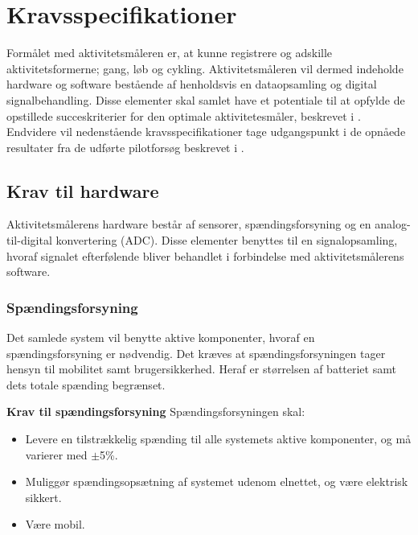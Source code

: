\section{Kravsspecifikationer}
Formålet med aktivitetsmåleren er, at kunne registrere og adskille aktivitetsformerne; gang, løb og cykling. Aktivitetsmåleren vil dermed indeholde hardware og software bestående af henholdsvis en dataopsamling og digital signalbehandling. Disse elementer skal samlet have et potentiale til at opfylde de opstillede succeskriterier for den optimale aktivitetesmåler, beskrevet i . \newline
Endvidere vil nedenstående kravsspecifikationer tage udgangspunkt i de opnåede resultater fra de udførte pilotforsøg beskrevet i  .

\subsection{Krav til hardware}
Aktivitetsmålerens hardware består af sensorer, spændingsforsyning og en analog-til-digital konvertering (ADC). Disse elementer benyttes til en signalopsamling, hvoraf signalet efterfølende bliver behandlet i forbindelse med aktivitetsmålerens software.

\subsubsection{Spændingsforsyning}
Det samlede system vil benytte aktive komponenter, hvoraf en spændingsforsyning er nødvendig. Det kræves at spændingsforsyningen tager hensyn til mobilitet samt brugersikkerhed. Heraf er størrelsen af batteriet samt dets totale spænding begrænset.

\textbf{Krav til spændingsforsyning} \newline 
Spændingsforsyningen skal:
\begin{itemize}
	\item Levere en tilstrækkelig spænding til alle systemets aktive komponenter, og må varierer med $\pm$5\%.
	\item Muliggør spændingsopsætning af systemet udenom elnettet, og være elektrisk sikkert.
	\item Være mobil.
\end{itemize}

